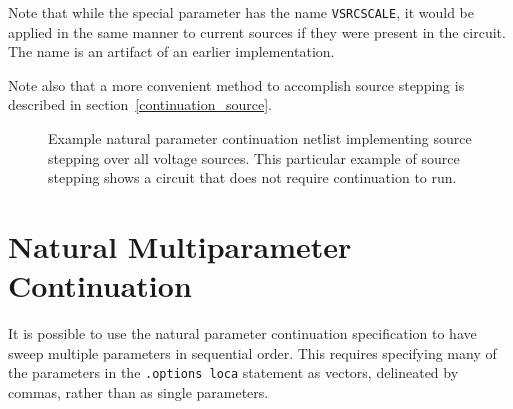 Note that while the special parameter has the name \texttt{VSRCSCALE}, 
it would be applied in the same manner to current sources if they were
present in the circuit.  The name is an artifact of an earlier 
implementation.

Note also that a more convenient method to accomplish source stepping is described in 
section~\ref{continuation_source}.

\begin{figure}[htbp]
\begin{centering}
\caption[Example natural parameter continuation netlist]{Example natural parameter continuation netlist implementing source stepping over all voltage sources. This particular example of source stepping shows a circuit that does not require continuation to run.\label{Continuation_Netlist_sourceStepping2}}
\end{centering}
\end{figure}

\newpage 
\section{Natural Multiparameter Continuation} 
\label{continuation_natural_multiparam}

It is possible to use the natural parameter continuation specification to  
have \Xyce{} sweep multiple parameters in sequential order.  This 
requires specifying many of the parameters in the \texttt{.options loca} statement as vectors, delineated by commas, rather than as single parameters.  


